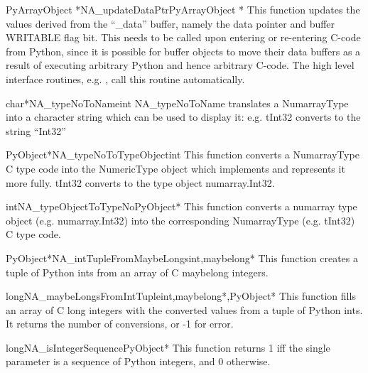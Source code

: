 \begin{cfuncdesc}{PyArrayObject *}{NA_updateDataPtr}{PyArrayObject *}
This function updates the values derived from the ``_data'' buffer, namely the
data pointer and buffer WRITABLE flag bit.  This needs to be called upon
entering or re-entering C-code from Python, since it is possible for buffer
objects to move their data buffers as a result of executing arbitrary Python
and hence arbitrary C-code.  The high level interface routines,
e.g. , call this routine automatically.
\end{cfuncdesc}

\begin{cfuncdesc}{char*}{NA_typeNoToName}{int}
NA_typeNoToName translates a NumarrayType into a character string which can be
used to display it:  e.g.  tInt32 converts to the string ``Int32''
\end{cfuncdesc}

\begin{cfuncdesc}{PyObject*}{NA_typeNoToTypeObject}{int}
This function converts a NumarrayType C type code into the NumericType object
which implements and represents it more fully.  tInt32 converts to the type
object numarray.Int32.  
\end{cfuncdesc}

\begin{cfuncdesc}{int}{NA_typeObjectToTypeNo}{PyObject*}
This function converts a numarray type object (e.g. numarray.Int32) into the
corresponding NumarrayType (e.g. tInt32) C type code. 
\end{cfuncdesc}

\begin{cfuncdesc} {PyObject*}{NA_intTupleFromMaybeLongs}{int,maybelong*}
This function creates a tuple of Python ints from an array of C maybelong integers.
\end{cfuncdesc}

\begin{cfuncdesc}{long}{NA_maybeLongsFromIntTuple}{int,maybelong*,PyObject*}
This function fills an array of C long integers with the converted values from
a tuple of Python ints.  It returns the number of conversions, or -1 for error.
\end{cfuncdesc}

\begin{cfuncdesc}{long}{NA_isIntegerSequence}{PyObject*}
This function returns 1 iff the single parameter is a sequence of Python
integers, and 0 otherwise.
\end{cfuncdesc}

